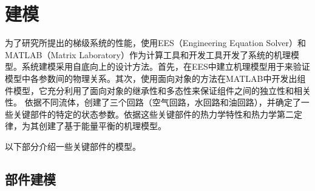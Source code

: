 \chapter{建模}
\label{cha:Modeling}

为了研究所提出的梯级系统的性能，使用EES（Engineering Equation Solver）和MATLAB（Matrix Laboratory）作为计算工具和开发工具开发了系统的机理模型。系统建模采用自底向上的设计方法。首先，在EES中建立机理模型用于来验证模型中各参数间的物理关系。其次，使用面向对象的方法在MATLAB中开发出组件模型，它充分利用了面向对象的继承性和多态性来保证组件之间的独立性和相关性。
依据不同流体，创建了三个回路（空气回路，水回路和油回路），并确定了一些关键部件的特定的状态参数。依据这些关键部件的热力学特性和热力学第二定律，为其创建了基于能量平衡的机理模型。

以下部分介绍一些关键部件的模型。

\section{部件建模}
